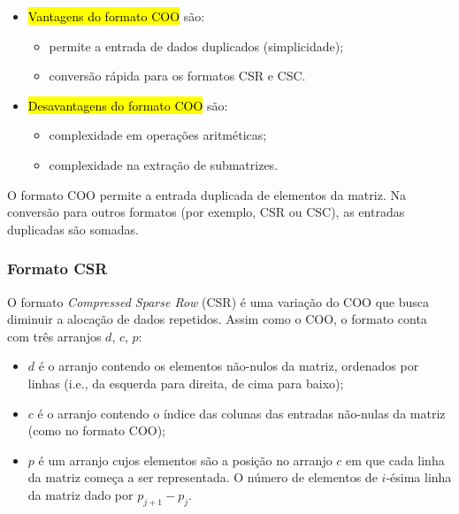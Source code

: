 \begin{itemize}
\item \hl{Vantagens do formato COO} são:
  \begin{itemize}
  \item permite a entrada de dados duplicados (simplicidade);
  \item conversão rápida para os formatos CSR e CSC.
  \end{itemize}
  
\item \hl{Desavantagens do formato COO} são:
  \begin{itemize}
  \item complexidade em operações aritméticas;
  \item complexidade na extração de submatrizes.
  \end{itemize}
\end{itemize}

\begin{obs}
  O formato COO permite a entrada duplicada de elementos da matriz. Na conversão para outros formatos (por exemplo, CSR ou CSC), as entradas duplicadas são somadas.
\end{obs}

\subsubsection{Formato CSR}
\badgeRevisar

O formato {\it Compressed Sparse Row} (CSR) é uma variação do COO que busca diminuir a alocação de dados repetidos. Assim como o COO, o formato conta com três arranjos $d$, $c$, $p$:
\begin{itemize}
\item $d$ é o arranjo contendo os elementos não-nulos da matriz, ordenados por linhas (i.e., da esquerda para direita, de cima para baixo);
\item $c$ é o arranjo contendo o índice das colunas das entradas não-nulas da matriz (como no formato COO);
\item $p$ é um arranjo cujos elementos são a posição no arranjo $c$ em que cada linha da matriz começa a ser representada. O número de elementos de $i$-ésima linha da matriz dado por $p_{j+1}-p_j$.
\end{itemize}

